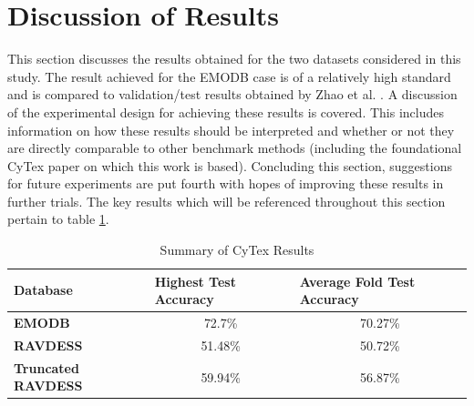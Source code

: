 \section{Discussion of Results}
This section discusses the results obtained for the two datasets considered in this study. The result achieved for the EMODB case is of a relatively high standard and is compared to validation/test results obtained by Zhao et al. \cite{ZHAO2019}. A discussion of the experimental design for achieving these results is covered. This includes information on how these results should be interpreted and whether or not they are directly comparable to other benchmark methods (including the foundational CyTex paper on which this work is based).  Concluding this section, suggestions for future experiments are put fourth with hopes of improving these results in further trials. The key results which will be referenced throughout this section pertain to table \ref{CytexResults_table}.
\begin{table}[ht]
    \centering
    \begin{tabular}{|l|c|c|}
    \hline
    Database & \multicolumn{1}{l|}{Highest Test Accuracy} & \multicolumn{1}{l|}{Average Fold Test Accuracy} \\ \hline
    \textbf{EMODB}             & 72.7\%  & 70.27\% \\ \hline
    \textbf{RAVDESS}           & 51.48\% & 50.72\% \\ \hline
    \textbf{Truncated RAVDESS} & 59.94\% & 56.87\% \\ \hline
    \end{tabular}
    \caption{Summary of CyTex Results}
    \label{CytexResults_table}
\end{table}


